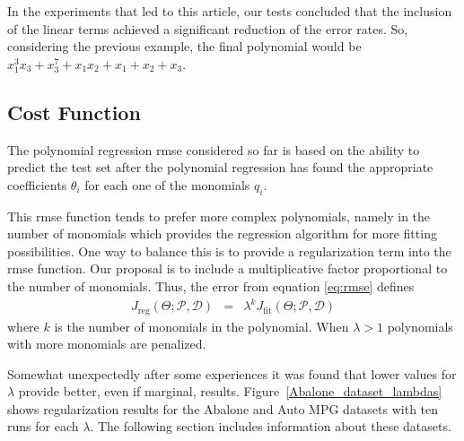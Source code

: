 \documentclass[preprint,authoryear,12pt]{elsarticle}
\begin{document}
In the experiments that led to this article, our tests concluded that the inclusion of the linear terms achieved a significant reduction of the error rates. So, considering the previous example, the final polynomial would be $x_1^3 x_3 + x_3^7 + x_1 x_2 + x_1 + x_2 + x_3$.


\subsection{Cost Function}\label{subs:cost.function}

The polynomial regression \ac{rmse} considered so far is based on the ability to predict the test set after the polynomial regression has found the appropriate coefficients $\theta_i$ for each one of the monomials $q_i$.

This \ac{rmse} function tends to prefer more complex polynomials, namely in the number of monomials which provides the regression algorithm for more fitting possibilities. One way to balance this is to provide a regularization term into the \ac{rmse} function. Our proposal is to include a multiplicative factor proportional to the number of monomials. Thus, the error from equation \ref{eq:rmse} defines
\begin{eqnarray}
J_{\textrm{reg}}\left(\Theta;\mathcal{P},\mathcal{D}\right) &=& \lambda^{k} J_{\textrm{fit}}\left(\Theta;\mathcal{P},\mathcal{D}\right)\label{eq:rmse-reg}
\end{eqnarray}
%
where $k$ is the number of monomials in the polynomial. When $\lambda > 1$ polynomials with more monomials are penalized.

Somewhat unexpectedly after some experiences it was found that lower values for $\lambda$ provide better, even if marginal, results. Figure~\ref{Abalone_dataset_lambdas} shows regularization results for the Abalone and Auto MPG datasets with ten runs for each $\lambda$. The following section  includes information about these datasets.
\end{document}
